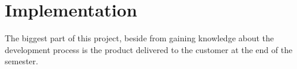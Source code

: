 \chapter{Implementation}

The biggest part of this project, beside from gaining knowledge about the development process is the product delivered to the customer at the end of the semester.




